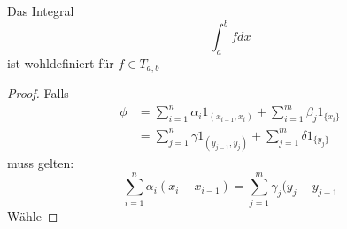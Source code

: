 \begin{lemma}
	Das Integral
	\[
	\int_a^b f dx 
	\]
	ist wohldefiniert für $f \in T_{a,b}$ 
\end{lemma}

\begin{proof}

	Falls \begin{align*}
	\phi &= \sum_{i=1}^{n}\alpha_i 1_{(x_{i-1}, x_{i})} + \sum_{i=1}^{m}\beta_j 1_{\{x_{i}\} } \\
	     &= \sum_{j=1}^{n}\gamma 1_{(y_{j-1},y_j)} + \sum_{j=1}^{m}\delta 1_{\{y_j\}}
\end{align*}
muss gelten:
\[
	\sum_{i=1}^{n}\alpha_i (x_{i}-x_{i-1}) = \sum_{j=1}^{m}\gamma_j (y_j - y_{j-1}
\]
Wähle 
\end{proof}
